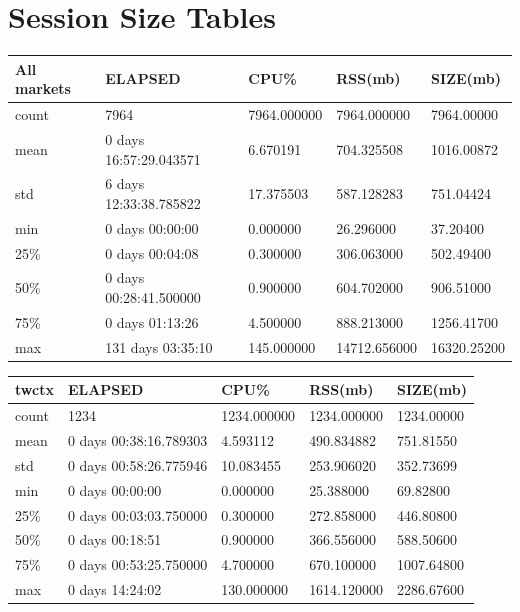 \documentclass{article}
\begin{document}
\appendix
\section{Session Size Tables}
\label{SECTION-SessionTables}

\begin{tabular}{|l|l|l|l|l|}
\hline 
\hline All markets & ELAPSED &        CPU\% &      RSS(mb) &     SIZE(mb) \\
\hline count &                   7964 &  7964.000000 &  7964.000000 &   7964.00000 \\
\hline mean &   0 days 16:57:29.043571 &    6.670191 &   704.325508 &  1016.00872 \\
\hline std &    6 days 12:33:38.785822 &   17.375503 &   587.128283 &   751.04424 \\
\hline min &         0 days 00:00:00 &    0.000000 &    26.296000 &    37.20400 \\
\hline 25\% &           0 days 00:04:08 &    0.300000 &   306.063000 &   502.49400 \\
\hline 50\% &   0 days 00:28:41.500000 &    0.900000 &   604.702000 &   906.51000 \\
\hline 75\%  &         0 days 01:13:26 &    4.500000 &   888.213000 &  1256.41700 \\
\hline max &       131 days 03:35:10 &  145.000000 & 14712.656000 & 16320.25200 \\
\hline 
\end{tabular}


\begin{tabular}{|l|l|l|l|l|}
\hline 
\hline twctx& ELAPSED&  CPU\%&  RSS(mb)&  SIZE(mb) \\
\hline count&   1234& 1234.000000& 1234.000000& 1234.00000 \\
\hline mean&  0 days 00:38:16.789303&   4.593112&  490.834882&  751.81550 \\
\hline std&  0 days 00:58:26.775946&  10.083455&  253.906020&  352.73699 \\
\hline min&   0 days 00:00:00&   0.000000&  25.388000&  69.82800 \\
\hline 25\%&  0 days 00:03:03.750000&   0.300000&  272.858000&  446.80800 \\
\hline 50\%&   0 days 00:18:51&   0.900000&  366.556000&  588.50600 \\
\hline 75\%&  0 days 00:53:25.750000&   4.700000&  670.100000& 1007.64800 \\
\hline max&   0 days 14:24:02&  130.000000& 1614.120000& 2286.67600 \\
\hline 
\end{tabular}
\end{document}
